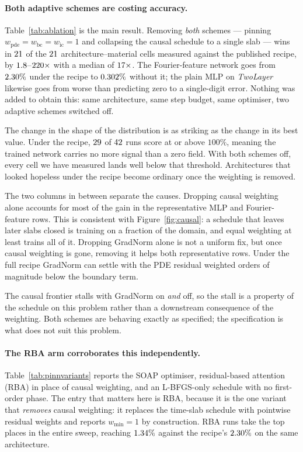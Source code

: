 \paragraph{Both adaptive schemes are costing accuracy.}

Table~\ref{tab:ablation} is the main result. Removing \emph{both} schemes ---
pinning $w_{\mathrm{pde}} = w_{\mathrm{bc}} = w_{\mathrm{ic}} = 1$ and
collapsing the causal schedule to a single slab --- wins in
$21$ of the $21$ architecture--material cells measured against
the published recipe, by
$1.8$--$220\times$ with a median of
$17\times$. The Fourier-feature network goes from
$2.30\%$ under the recipe to $0.302\%$ without it; the plain
MLP on \emph{TwoLayer} likewise goes from worse than predicting zero to a
single-digit error. Nothing was added to obtain this: same architecture, same
step budget, same optimiser, two adaptive schemes switched off.

The change in the shape of the distribution is as striking as the change in its
best value. Under the recipe, $29$ of $42$
runs score at or above $100\%$, meaning the trained network carries no more
signal than a zero field. With both schemes off, every cell we have measured
lands well below that threshold. Architectures that looked hopeless under the
recipe become ordinary once the weighting is removed.

The two columns in between separate the causes. Dropping causal weighting alone
accounts for most of the gain in the representative MLP and Fourier-feature
rows. This is consistent with Figure~\ref{fig:causal}: a schedule that leaves
later slabs closed is training on a fraction of the domain, and equal weighting
at least trains all of it. Dropping GradNorm alone is not a uniform fix, but
once causal weighting is gone, removing it helps both representative rows.
Under the full recipe GradNorm can settle with the PDE residual weighted orders
of magnitude below the boundary term.

The causal frontier stalls with GradNorm on \emph{and} off, so the stall is a
property of the schedule on this problem rather than a downstream consequence
of the weighting. Both schemes are behaving exactly as specified; the
specification is what does not suit this problem.

\paragraph{The RBA arm corroborates this independently.}
Table~\ref{tab:pinnvariants} reports the SOAP optimiser, residual-based
attention (RBA) in place of causal weighting, and an L-BFGS-only schedule with
no first-order phase. The entry that matters here is RBA, because it is the one
variant that \emph{removes} causal weighting: it replaces the time-slab schedule
with pointwise residual weights and reports $w_{\min} = 1$ by construction. RBA
runs take the top places in the entire sweep, reaching $1.34\%$
against the recipe's $2.30\%$ on the same architecture.

